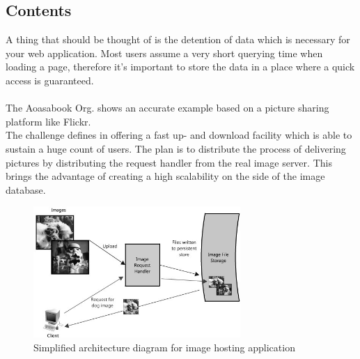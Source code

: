 \documentclass[12p]{article}
\begin{document}
	\subsection{Contents}
	A thing that should be thought of is the detention of data which is necessary for your web application. Most users assume a very short querying time when loading a page, therefore it's important to store the data in a place where a quick access is guaranteed.\\
	\\
	The Aoasabook Org. shows an accurate example based on a picture sharing platform like Flickr.\\
	The challenge defines in offering a fast up- and download facility which is able to sustain a huge count of users. The plan is to distribute the process of delivering pictures by distributing the request handler from the real image server. This brings the advantage of creating a high scalability on the side of the image database.
	\begin{figure}[h!]
		\centering
		\includegraphics[width=0.7\textwidth]{img/appLayerImage1.jpg}
		\caption{Simplified architecture diagram for image hosting application \cite{cache}}
	\end{figure}
\end{document}

